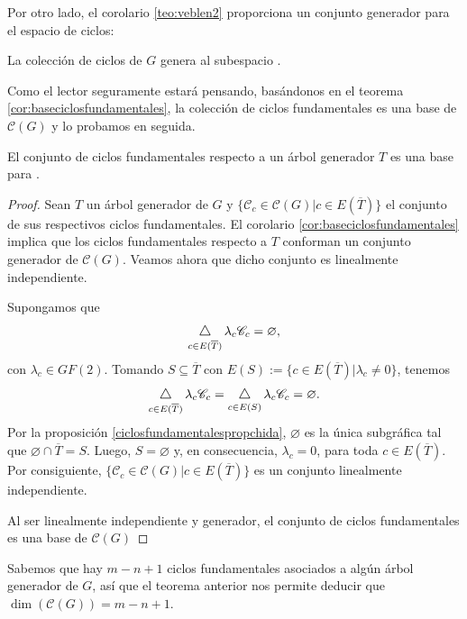 Por otro lado, el corolario \ref{teo:veblen2} proporciona un conjunto generador para el espacio de ciclos:

\begin{teo}
\begin{center}
    La colección de ciclos de $G$ genera al subespacio \cyclet.
\end{center}
\end{teo}

Como el lector seguramente estará pensando, basándonos en el teorema \ref{cor:baseciclosfundamentales}, la colección de ciclos fundamentales es una base de $\mathcal{C}(G)$ y lo probamos en seguida.

\begin{teo}
El conjunto de ciclos fundamentales respecto a un árbol generador $T$ es una base para \cyclet.
 \end{teo}
 
 \begin{proof} Sean $T$ un árbol generador de $G$ y $\{\mathscr{C}_{c} \in \mathcal{C}(G) | c \in E(\overline{T})\}$ el conjunto de sus respectivos ciclos fundamentales. El corolario \ref{cor:baseciclosfundamentales} implica que los ciclos fundamentales respecto a $T$ conforman un conjunto generador de $\mathcal{C}(G)$. Veamos ahora que dicho conjunto es linealmente independiente.
 
Supongamos que $$\difsym_{c \in E(\overline{T})} \lambda_{c}\mathscr{C}_{c} = \varnothing,$$ con $\lambda_{c} \in GF(2)$.  Tomando $S\subseteq \overline{T}$ con $E(S):=\{c \in E(\overline{T}) | \lambda_{c} \neq 0\}$, tenemos
$$
\difsym_{c \in E(\overline{T})} \lambda_{c}\mathscr{C}_{c} = \difsym_{c \in E(S)} \lambda_{c}\mathscr{C}_{c}= \varnothing.
$$
Por la proposición \ref{ciclosfundamentalespropchida},  $\varnothing$ es la única subgráfica tal que $\varnothing \cap \overline{T} = S$. Luego, $S = \varnothing$ y, en consecuencia, $\lambda_{c}=0$, para toda $c \in E(\overline{T})$. Por consiguiente, $\{\mathscr{C}_{c} \in \mathcal{C}(G) | c \in E(\overline{T})\}$ es un conjunto linealmente independiente. 

Al ser linealmente independiente y generador, el conjunto de ciclos fundamentales es una base de $\mathcal{C}(G)$

 \end{proof}

Sabemos que hay $m -n+1$ ciclos fundamentales asociados a algún árbol generador de $G$, así que el teorema anterior nos permite deducir que $\dim(\mathcal{C}(G))=m-n+1$.

